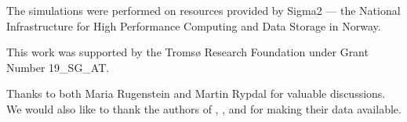 \documentclass[draft]{agujournal2019}
\providecommand{\DIFaddbegin}{} %
\providecommand{\DIFaddend}{} %
\providecommand{\DIFdelbegin}{} %
\providecommand{\DIFdelend}{} %
\begin{document}
  \acknowledgments

  The simulations were performed on resources provided by Sigma2 --- the National
  Infrastructure for High Performance Computing and Data Storage in Norway.

  This work was supported by the Tromsø Research Foundation under Grant Number
  19\_SG\_AT.

  Thanks to both Maria Rugenstein and Martin Rypdal for valuable discussions. We would
  also like to thank the authors of , , and
   for making their data available.

  \DIFdelbegin %
\DIFdelend \DIFaddbegin 
\DIFaddend 
\end{document}
